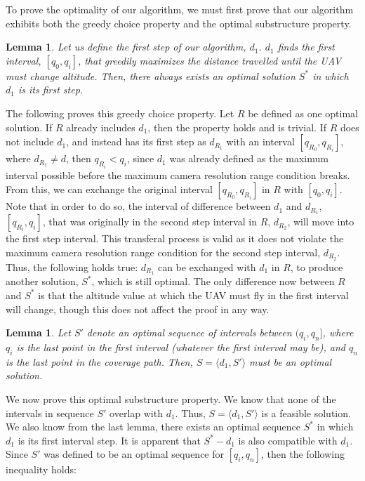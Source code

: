 \documentclass[conference]{IEEEtran}
\theoremstyle{plain}%
\newtheorem{lemma}[theorem]{Lemma}
\begin{document}
To prove the optimality of our algorithm, we must first prove that our algorithm exhibits both the greedy choice property and the optimal substructure property.
\begin{lemma} %
Let us define the first step of our algorithm, $d_1$. $d_1$ finds the first interval, $[q_0, q_i]$, that greedily maximizes the distance travelled until the UAV must change altitude. Then, there always exists an optimal solution $S^*$ in which $d_1$ is its first step.
\end{lemma}
The following proves this greedy choice property. Let $R$ be defined as one optimal solution. If $R$ already includes $d_1$, then the property holds and is trivial. If $R$ does not include $d_1$, and instead has its first step as $d_{R_1}$ with an interval $[q_{R_0}, q_{R_i}]$, where $d_{R_1} \neq d$, then $q_{R_i} < q_i$, since $d_1$ was already defined as the maximum interval possible before the maximum camera resolution range condition breaks. From this, we can exchange the original interval $[q_{R_0}, q_{R_i}]$ in $R$ with $[q_0, q_i]$. Note that in order to do so, the interval of difference between $d_1$ and $d_{R_1}$, $[q_{R_i}, q_i]$, that was originally in the second step interval in $R$, $d_{R_2}$, will move into the first step interval. This transferal process is valid as it does not violate the maximum camera resolution range condition for the second step interval, $d_{R_2}$. Thus, the following holds true: $d_{R_1}$ can be exchanged with $d_1$ in $R$, to produce another solution, $S^*$, which is still optimal. The only difference now between $R$ and $S^*$ is that the altitude value at which the UAV must fly in the first interval will change, though this does not affect the proof in any way.
\begin{lemma} %
Let $S'$ denote an optimal sequence of intervals between $(q_i, q_n]$, where $q_i$ is the last point in the first interval (whatever the first interval may be), and $q_n$ is the last point in the coverage path. Then, $S = \langle d_1, S' \rangle$ must be an optimal solution.
\end{lemma}
We now prove this optimal substructure property. We know that none of the intervals in sequence $S'$ overlap with $d_1$. Thus, $S = \langle d_1, S' \rangle$ is a feasible solution. We also know from the last lemma, there exists an optimal sequence $S^*$ in which $d_1$ is its first interval step. It is apparent that $S^* - d_1$ is also compatible with $d_1$. Since $S'$ was defined to be an optimal sequence for $[q_i, q_n]$, then the following inequality holds:
\end{document}
